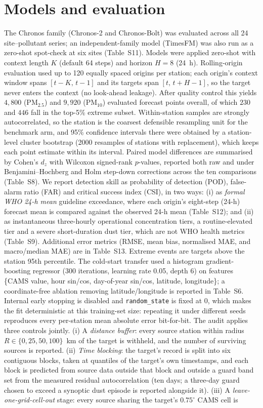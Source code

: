 \documentclass[11pt]{article}
\begin{document}
\section{Models and evaluation}
The Chronos family (Chronos-2 and Chronos-Bolt) was evaluated across all 24 site--pollutant series; an independent-family model (TimesFM) was also run as a zero-shot spot-check at six sites (Table~S11). Models were applied zero-shot with context length $K$ (default 64 steps) and horizon $H=8$ (24~h). Rolling-origin evaluation used up to 120 equally spaced origins per station; each origin's context window spans $[t-K,\,t-1]$ and its targets span $[t,\,t+H-1]$, so the target never enters the context (no look-ahead leakage). After quality control this yields $4{,}800$ ($\text{PM}_{2.5}$) and $9{,}920$ ($\text{PM}_{10}$) evaluated forecast points overall, of which $230$ and $446$ fall in the top-5\% extreme subset. Within-station samples are strongly autocorrelated, so the station is the coarsest defensible resampling unit for the benchmark arm, and 95\% confidence intervals there were obtained by a station-level cluster bootstrap (2000 resamples of stations with replacement), which keeps each point estimate within its interval. Paired model differences are summarised by Cohen's $d_z$ with Wilcoxon signed-rank $p$-values, reported both raw and under Benjamini--Hochberg and Holm step-down corrections across the ten comparisons (Table~S8). We report detection skill as probability of detection (POD), false-alarm ratio (FAR) and critical success index (CSI), in two ways: (i) as \emph{formal WHO 24-h mean} guideline exceedance, where each origin's eight-step (24-h) forecast mean is compared against the observed 24-h mean (Table~S12); and (ii) as instantaneous three-hourly operational concentration tiers, a routine-elevated tier and a severe short-duration dust tier, which are not WHO health metrics (Table~S9). Additional error metrics (RMSE, mean bias, normalised MAE, and macro/median MAE) are in Table~S13. Extreme events are targets above the station 95th percentile. The cold-start transfer used a histogram gradient-boosting regressor (300 iterations, learning rate 0.05, depth 6) on features \{CAMS value, hour sin/cos, day-of-year sin/cos, latitude, longitude\}; a coordinate-free ablation removing latitude/longitude is reported in Table~S6. Internal early stopping is disabled and \texttt{random\_state} is fixed at 0, which makes the fit deterministic at this training-set size: repeating it under different seeds reproduces every per-station mean absolute error bit-for-bit. The audit applies three controls jointly. (i) A \emph{distance buffer}: every source station within radius $R\in\{0,25,50,100\}$~km of the target is withheld, and the number of surviving sources is reported. (ii) \emph{Time blocking}: the target's record is split into six contiguous blocks, taken at quantiles of the target's own timestamps, and each block is predicted from source data outside that block and outside a guard band set from the measured residual autocorrelation (ten days; a three-day guard chosen to exceed a synoptic dust episode is reported alongside it). (iii) A \emph{leave-one-grid-cell-out} stage: every source sharing the target's $0.75^\circ$ CAMS cell is 
\end{document}
